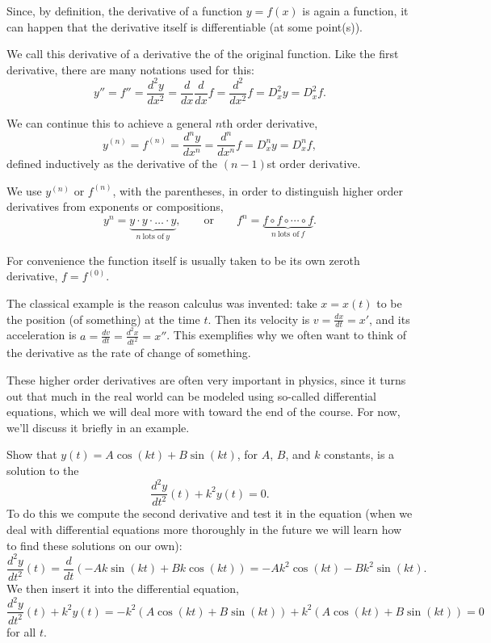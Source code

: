 
Since, by definition, the derivative of a function $y = f(x)$ is again a function, it can happen that the derivative itself is differentiable (at some point(s)).

We call this derivative of a derivative the  of the original function. Like the first derivative, there are many notations used for this:
\[
	y'' = f'' = \frac{d^2 y}{d x^2} = \frac{d}{d x} \frac{d}{d x} f = \frac{d^2}{d x^2} f = D_x^2 y = D_x^2 f.
\]

\noindent
We can continue this to achieve a general $n$th order derivative,
\[
	y^{(n)} = f^{(n)} = \frac{d^n y}{d x^n} = \frac{d^n}{d x^n} f = D_x^n y = D_x^n f,
\]
defined inductively as the derivative of the $(n - 1)$st order derivative.

\begin{remark}
	We use $y^{(n)}$ or $f^{(n)}$, with the parentheses, in order to distinguish higher order derivatives from exponents or compositions,
	\[
		y^n = \underbrace{y \cdot y \cdot \ldots \cdot y}_{n ~\text{lots of}~ y}, \qquad \text{or} \qquad  f^n = \underbrace{f \circ f \circ \cdots \circ f}_{n~\text{lots of}~f}.
	\]
\end{remark}

\noindent
For convenience the function itself is usually taken to be its own zeroth derivative, $f = f^{(0)}$.

\begin{example}
	The classical example is the reason calculus was invented: take $x = x(t)$ to be the position (of something) at the time $t$. Then its velocity is $v = \frac{d x}{d t} = x'$, and its acceleration is $a = \frac{d v}{d t} = \frac{d^2 x}{d t^2} = x''$. This exemplifies why we often want to think of the derivative as the rate of change of something.
\end{example}

\noindent
These higher order derivatives are often very important in physics, since it turns out that much in the real world can be modeled using so-called differential equations, which we will deal more with toward the end of the course. For now, we'll discuss it briefly in an example.

\begin{example}
	Show that $y(t) = A \cos(k t) + B \sin(k t)$, for $A$, $B$, and $k$ constants, is a solution to the 
	\[
		\frac{d^2 y}{d t^2} (t) + k^2 y(t) = 0.
	\]
	To do this we compute the second derivative and test it in the equation (when we deal with differential equations more thoroughly in the future we will learn how to find these solutions on our own):
	\[
		\frac{d^2 y}{d t^2}(t) = \frac{d}{d t} (-A k \sin(k t) + B k \cos(k t)) = -A k^2 \cos(k t) - B k^2 \sin(k t).
	\]
	We then insert it into the differential equation,
	\[
		\frac{d^2 y}{d t^2} (t) + k^2 y(t) = - k^2 (A \cos(k t) + B \sin(k t)) + k^2 (A \cos(k t) + B \sin(k t)) = 0
	\]
	for all $t$.
\end{example}


